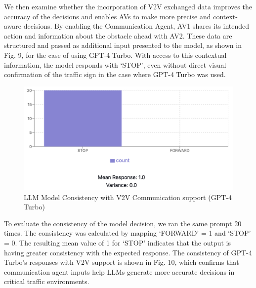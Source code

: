 \documentclass[conference]{IEEEtran}
\begin{document}
We then examine whether the incorporation of V2V exchanged data improves the accuracy of the decisions and enables AVs to make more precise and context-aware decisions. By enabling the Communication Agent, AV1 shares its intended action and information about the obstacle ahead with AV2. These data are structured and passed as additional input presented to the model, as shown in Fig. 9, for the case of using GPT-4 Turbo. With access to this contextual information, the model responds with `STOP', even without direct visual confirmation of the traffic sign in the case where GPT-4 Turbo was used. 
\begin{figure}[!ht]
     \centering
     \includegraphics[width=.9\linewidth]{Fig/mean_wtihCA.png}
     \caption{LLM Model Consistency with V2V Communication support (GPT-4 Turbo) }
     \label{fig:enter-label}
\end{figure}

To evaluate the consistency of the model decision, we ran the same prompt 20 times. The consistency was calculated by mapping `FORWARD' = 1 and `STOP' = 0. The resulting mean value of 1 for `STOP' indicates that the output is having greater consistency with the expected response. The consistency of GPT-4 Turbo's responses with V2V support is shown in Fig. 10, which confirms that communication agent inputs help LLMs generate more accurate decisions in critical traffic environments.



\end{document}
